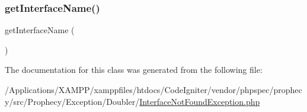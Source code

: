 \subsubsection{\texorpdfstring{get\+Interface\+Name()}{getInterfaceName()}}
{\footnotesize\ttfamily get\+Interface\+Name (\begin{DoxyParamCaption}{ }\end{DoxyParamCaption})}



The documentation for this class was generated from the following file\+:\begin{DoxyCompactItemize}
\item 
/\+Applications/\+X\+A\+M\+P\+P/xamppfiles/htdocs/\+Code\+Igniter/vendor/phpspec/prophecy/src/\+Prophecy/\+Exception/\+Doubler/\mbox{\hyperlink{_interface_not_found_exception_8php}{Interface\+Not\+Found\+Exception.\+php}}\end{DoxyCompactItemize}
